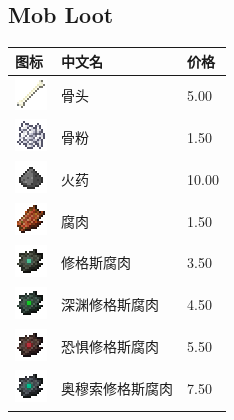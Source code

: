 \documentclass[UTF8]{ctexart}
\begin{document}
\subsection{Mob Loot}
\begin{longtable}[]{|p{1cm}|p{8cm}|p{1.5cm}|}
\toprule
图标 & 中文名 & 价格\\
\midrule
	\includegraphics{.workspace/icons/minecraft/minecraft__bone__0.png} & 骨头 &5.00\\
	\hline
	\includegraphics{.workspace/icons/minecraft/minecraft__dye__15.png} & 骨粉 &1.50\\
	\hline
	\includegraphics{.workspace/icons/minecraft/minecraft__gunpowder__0.png} & 火药 &10.00\\
	\hline
	\includegraphics{.workspace/icons/minecraft/minecraft__rotten_flesh__0.png} & 腐肉 &1.50\\
	\hline
	\includegraphics{.workspace/icons/abyssalcraft/abyssalcraft__shoggothflesh__0.png} & 修格斯腐肉 &3.50\\
	\hline
	\includegraphics{.workspace/icons/abyssalcraft/abyssalcraft__shoggothflesh__1.png} & 深渊修格斯腐肉 &4.50\\
	\hline
	\includegraphics{.workspace/icons/abyssalcraft/abyssalcraft__shoggothflesh__2.png} & 恐惧修格斯腐肉 &5.50\\
	\hline
	\includegraphics{.workspace/icons/abyssalcraft/abyssalcraft__shoggothflesh__3.png} & 奥穆索修格斯腐肉 &7.50\\

\end{longtable}
\end{document}
